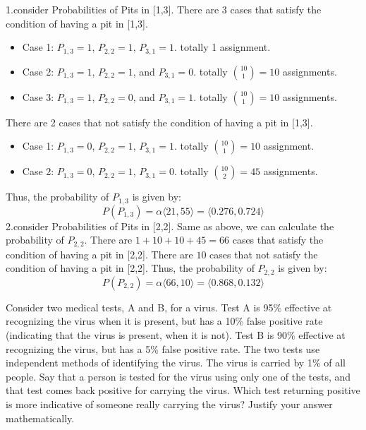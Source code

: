 \documentclass[cn,12pt]{homework}
\begin{document}
\begin{solution}
1.consider Probabilities of Pits in [1,3]. There are 3 cases that satisfy the condition of having a pit in [1,3].
\begin{itemize}
  \item Case 1: $P_{1,3} = 1$, $P_{2,2} = 1$, $P_{3,1} = 1$. totally 1 assignment.
  \item Case 2: $P_{1,3} = 1$, $P_{2,2} = 1$, and $P_{3,1} = 0$. totally $\binom{10}{1}=10$ assignments.
  \item Case 3: $P_{1,3} = 1$, $P_{2,2} = 0$, and $P_{3,1} = 1$. totally $\binom{10}{1}=10$ assignments.
\end{itemize}
There are 2 cases that not satisfy the condition of having a pit in [1,3].
\begin{itemize}
  \item Case 1: $P_{1,3} = 0$, $P_{2,2} = 1$, $P_{3,1} = 1$. totally $\binom{10}{1}=10$ assignment.
  \item Case 2: $P_{1,3} = 0$, $P_{2,2} = 1$, $P_{3,1} = 0$. totally $\binom{10}{2}=45$ assignments.
\end{itemize}
Thus, the probability of $P_{1,3}$ is given by:
\[
P(P_{1,3}) = \alpha \langle 21, 55 \rangle = \langle 0.276, 0.724 \rangle
\]
2.consider Probabilities of Pits in [2,2]. Same as above, we can calculate the probability of $P_{2,2}$.
There are $1+10+10+45=66$ cases that satisfy the condition of having a pit in [2,2].
There are $10$ cases that not satisfy the condition of having a pit in [2,2].
Thus, the probability of $P_{2,2}$ is given by:
\[
P(P_{2,2}) = \alpha \langle 66, 10 \rangle = \langle 0.868, 0.132 \rangle
\]
\end{solution}
\newpage

\begin{problem}

Consider two medical tests, A and B, for a virus. Test A is 95\% effective at recognizing the virus when it is present, but has a 10\% false positive rate (indicating that the virus is present, when it is not). Test B is 90\% effective at recognizing the virus, but has a 5\% false positive rate. The two tests use independent methods of identifying the virus. The virus is carried by 1\% of all people. Say that a person is tested for the virus using only one of the tests, and that test comes back positive for carrying the virus. Which test returning positive is more indicative of someone really carrying the virus? Justify your answer mathematically.
\end{problem}
\end{document}
